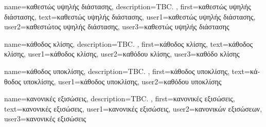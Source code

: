 {name={\foreignlanguage{greek}{καθεστώς υψηλής διάστασης}}, 
	description={TBC. },
   	first={\foreignlanguage{greek}{καθεστώς υψηλής διάστασης}},
   	text={\foreignlanguage{greek}{καθεστώς υψηλής διάστασης}},
	user1={\foreignlanguage{greek}{καθεστώς υψηλής διάστασης}}, %
  	user2={\foreignlanguage{greek}{καθεστώτος υψηλής διάστασης}}, %
	user3={\foreignlanguage{greek}{καθεστώς υψηλής διάστασης}} %
}

{name={\foreignlanguage{greek}{κάθοδος κλίσης}}, 
	description={TBC. },
	first={\foreignlanguage{greek}{κάθοδος κλίσης}},
	text={\foreignlanguage{greek}{κάθοδος κλίσης}},
	user1={\foreignlanguage{greek}{κάθοδος κλίσης}}, %
	user2={\foreignlanguage{greek}{καθόδου κλίσης}}, %
	user3={\foreignlanguage{greek}{καθόδο κλίσης}} %
}%

{name={\foreignlanguage{greek}{κάθοδος υποκλίσης}}, 
	description={TBC. },
	first={\foreignlanguage{greek}{κάθοδος υποκλίσης}},
	text={\foreignlanguage{greek}{κάθοδος υποκλίσης}},
	user1={\foreignlanguage{greek}{κάθοδος υποκλίσης}}, %
	user2={\foreignlanguage{greek}{καθόδου υποκλίσης}} %
}

{name={\foreignlanguage{greek}{κανονικές εξισώσεις}}, 
	description={TBC. },
	first={\foreignlanguage{greek}{κανονικές εξισώσεις}},
	text={\foreignlanguage{greek}{κανονικές εξισώσεις}},
	user1={\foreignlanguage{greek}{κανονικές εξισώσεις}}, %
	user2={\foreignlanguage{greek}{κανονικών εξισώσεων}}, %
	user3={\foreignlanguage{greek}{κανονικές εξισώσεις}} %
}

